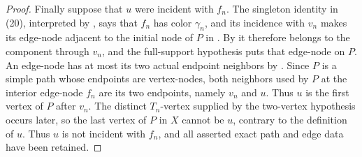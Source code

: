 \begin{proof}
Finally suppose that \(u\) were incident with \(f_n\).  The singleton
identity in (20), interpreted by , says that
\(f_n\) has color \(\gamma_n\), and its incidence with \(v_n\) makes its
edge-node adjacent to the initial node of \(P\) in
.  By  it
therefore belongs to the component through \(v_n\), and the full-support
hypothesis puts that edge-node on \(P\).  An edge-node has at most its two
actual endpoint neighbors by .  Since \(P\) is a simple path
whose endpoints are vertex-nodes, both neighbors used by \(P\) at the
interior edge-node \(f_n\) are its two endpoints, namely \(v_n\) and
\(u\).  Thus \(u\) is the first vertex of \(P\) after \(v_n\).  The
distinct \(T_n\)-vertex supplied by the two-vertex hypothesis occurs
later, so the last vertex of \(P\) in \(X\) cannot be \(u\), contrary to
the definition of \(u\).  Thus \(u\) is not incident with \(f_n\), and
all asserted exact path and edge data have been retained.
\end{proof}
